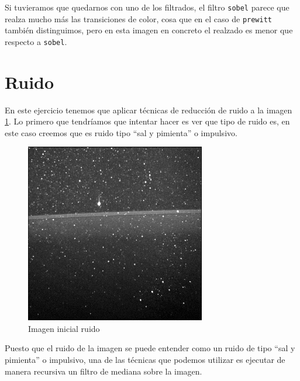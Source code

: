 \documentclass[12pt]{article}
\begin{document}
	\noindent Si tuvieramos que quedarnos con uno de los filtrados, el filtro \texttt{sobel} parece que realza mucho más las transiciones de color, cosa que en el caso de \texttt{prewitt} también distinguimos, pero en esta imagen en concreto el realzado es menor que respecto a \texttt{sobel}.
	
	\pagebreak
	
	\section{Ruido}
	
	\noindent En este ejercicio tenemos que aplicar técnicas de reducción de ruido a la imagen \ref{img: ruido src}. Lo primero que tendríamos que intentar hacer es ver que tipo de ruido es, en este caso creemos que es ruido tipo ``sal y pimienta'' o impulsivo.
	
	\begin{figure}[h]
		\begin{center}
			\includegraphics[width=0.7\textwidth]{img/ruido.jpg}
			\caption{Imagen inicial ruido}
			\label{img: ruido src}
		\end{center}
	\end{figure}
	
	\noindent Puesto que el ruido de la imagen se puede entender como un ruido de tipo ``sal y pimienta'' o impulsivo, una de las técnicas que podemos utilizar es ejecutar de manera recursiva un filtro de mediana sobre la imagen.
	
\end{document}
